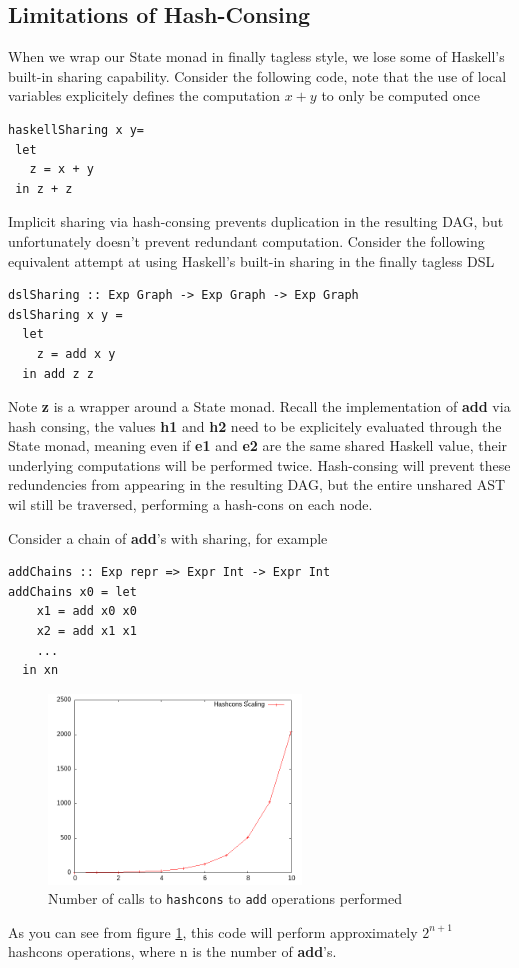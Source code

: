 \documentclass[runningheads]{llncs}
\begin{document}
\subsection{Limitations of Hash-Consing} \label{limithashcons}

When we wrap our State monad in finally tagless style, we lose some of Haskell's
built-in sharing capability. Consider the following code, note that the use of
local variables explicitely defines the computation $x + y$ to only be computed
once
\begin{verbatim}
haskellSharing x y=
 let
   z = x + y
 in z + z
\end{verbatim}

Implicit sharing via hash-consing prevents duplication in the resulting DAG, but
unfortunately doesn't prevent redundant computation. Consider the following
equivalent attempt at using Haskell's built-in sharing in the finally tagless DSL
\begin{verbatim}
dslSharing :: Exp Graph -> Exp Graph -> Exp Graph
dslSharing x y =
  let
    z = add x y
  in add z z
\end{verbatim}
Note {\bf z} is a wrapper around a State monad. Recall the implementation of
{\bf add} via hash consing, the values {\bf h1} and {\bf h2} need to be
explicitely evaluated through the State monad, meaning even if {\bf e1} and {\bf
  e2} are the same shared Haskell value, their underlying computations will be
performed twice. Hash-consing will prevent these redundencies from appearing in
the resulting DAG, but the entire unshared AST wil still be traversed,
performing a hash-cons on each node.

Consider a chain of {\bf add}'s  with sharing, for example
\begin{verbatim}
addChains :: Exp repr => Expr Int -> Expr Int
addChains x0 = let
    x1 = add x0 x0
    x2 = add x1 x1
    ...
  in xn
\end{verbatim}

\begin{figure}
  \centering
  \includegraphics[width=0.6\textwidth]{figs/hashcons.png}
  \caption{Number of calls to \texttt{hashcons} to \texttt{add} operations performed} \label{fig:hashcons}
\end{figure}
As you can see from figure \ref{fig:hashcons}, this code will perform approximately
$2^{n+1}$ hashcons operations, where n is the number of {\bf add}'s.
\end{document}
